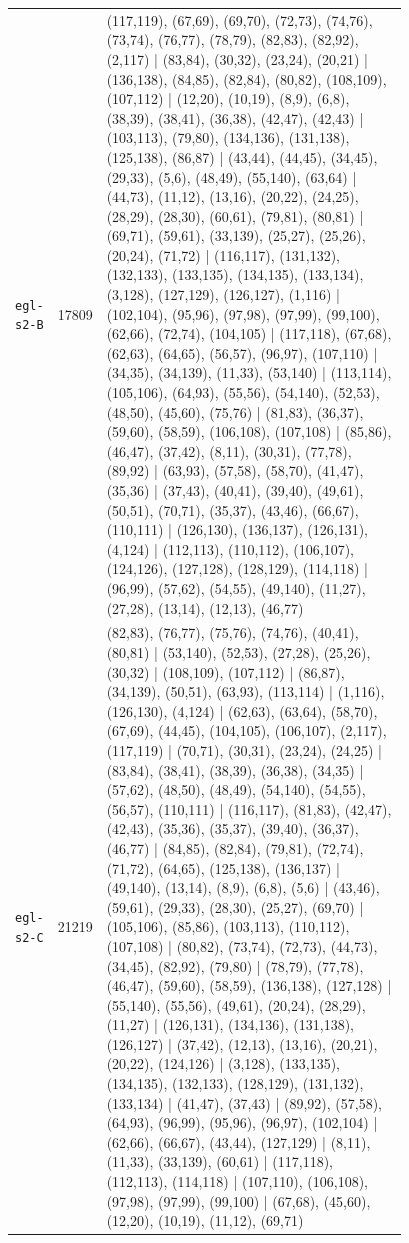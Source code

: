 \begin{landscape}
\begin{longtable}{lr>{\tiny\raggedright\arraybackslash}p{0.78\linewidth}}
\texttt{egl-s2-B} & 17809 & (117,119), (67,69), (69,70), (72,73), (74,76), (73,74), (76,77), (78,79), (82,83), (82,92), (2,117) | (83,84), (30,32), (23,24), (20,21) | (136,138), (84,85), (82,84), (80,82), (108,109), (107,112) | (12,20), (10,19), (8,9), (6,8), (38,39), (38,41), (36,38), (42,47), (42,43) | (103,113), (79,80), (134,136), (131,138), (125,138), (86,87) | (43,44), (44,45), (34,45), (29,33), (5,6), (48,49), (55,140), (63,64) | (44,73), (11,12), (13,16), (20,22), (24,25), (28,29), (28,30), (60,61), (79,81), (80,81) | (69,71), (59,61), (33,139), (25,27), (25,26), (20,24), (71,72) | (116,117), (131,132), (132,133), (133,135), (134,135), (133,134), (3,128), (127,129), (126,127), (1,116) | (102,104), (95,96), (97,98), (97,99), (99,100), (62,66), (72,74), (104,105) | (117,118), (67,68), (62,63), (64,65), (56,57), (96,97), (107,110) | (34,35), (34,139), (11,33), (53,140) | (113,114), (105,106), (64,93), (55,56), (54,140), (52,53), (48,50), (45,60), (75,76) | (81,83), (36,37), (59,60), (58,59), (106,108), (107,108) | (85,86), (46,47), (37,42), (8,11), (30,31), (77,78), (89,92) | (63,93), (57,58), (58,70), (41,47), (35,36) | (37,43), (40,41), (39,40), (49,61), (50,51), (70,71), (35,37), (43,46), (66,67), (110,111) | (126,130), (136,137), (126,131), (4,124) | (112,113), (110,112), (106,107), (124,126), (127,128), (128,129), (114,118) | (96,99), (57,62), (54,55), (49,140), (11,27), (27,28), (13,14), (12,13), (46,77) \\[2pt]
\texttt{egl-s2-C} & 21219 & (82,83), (76,77), (75,76), (74,76), (40,41), (80,81) | (53,140), (52,53), (27,28), (25,26), (30,32) | (108,109), (107,112) | (86,87), (34,139), (50,51), (63,93), (113,114) | (1,116), (126,130), (4,124) | (62,63), (63,64), (58,70), (67,69), (44,45), (104,105), (106,107), (2,117), (117,119) | (70,71), (30,31), (23,24), (24,25) | (83,84), (38,41), (38,39), (36,38), (34,35) | (57,62), (48,50), (48,49), (54,140), (54,55), (56,57), (110,111) | (116,117), (81,83), (42,47), (42,43), (35,36), (35,37), (39,40), (36,37), (46,77) | (84,85), (82,84), (79,81), (72,74), (71,72), (64,65), (125,138), (136,137) | (49,140), (13,14), (8,9), (6,8), (5,6) | (43,46), (59,61), (29,33), (28,30), (25,27), (69,70) | (105,106), (85,86), (103,113), (110,112), (107,108) | (80,82), (73,74), (72,73), (44,73), (34,45), (82,92), (79,80) | (78,79), (77,78), (46,47), (59,60), (58,59), (136,138), (127,128) | (55,140), (55,56), (49,61), (20,24), (28,29), (11,27) | (126,131), (134,136), (131,138), (126,127) | (37,42), (12,13), (13,16), (20,21), (20,22), (124,126) | (3,128), (133,135), (134,135), (132,133), (128,129), (131,132), (133,134) | (41,47), (37,43) | (89,92), (57,58), (64,93), (96,99), (95,96), (96,97), (102,104) | (62,66), (66,67), (43,44), (127,129) | (8,11), (11,33), (33,139), (60,61) | (117,118), (112,113), (114,118) | (107,110), (106,108), (97,98), (97,99), (99,100) | (67,68), (45,60), (12,20), (10,19), (11,12), (69,71) \\[2pt]

\end{longtable}
\end{landscape}
